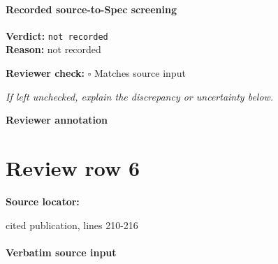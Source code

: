 \documentclass[10pt]{article}
\newcommand{\reviewerbox}{%
  \par\noindent\fbox{\parbox{0.96\linewidth}{\rule{0pt}{0.38in}}}\par
}
\newcommand{\reviewmatch}[1]{%
  \par\noindent\textbf{Reviewer check:} $\square$\; #1\par
  \noindent\emph{If left unchecked, explain the discrepancy or uncertainty below.}\par
}
\begin{document}
\paragraph{Recorded source-to-Spec screening}
\textbf{Verdict:} \texttt{not recorded}
\\
\textbf{Reason:} not recorded
\reviewmatch{Matches source input}
\noindent\textbf{Reviewer annotation}\par
\reviewerbox
\clearpage
\hypertarget{source-claim-a71947e08e3fd64a}{}
\section*{Review row 6}
\textbf{Source locator:} {\footnotesize\raggedright cited publication, lines 210-\allowbreak{}216\par}
\paragraph{Verbatim source input}
\begin{ReviewVerbatim}
\end{ReviewVerbatim}
\end{document}
